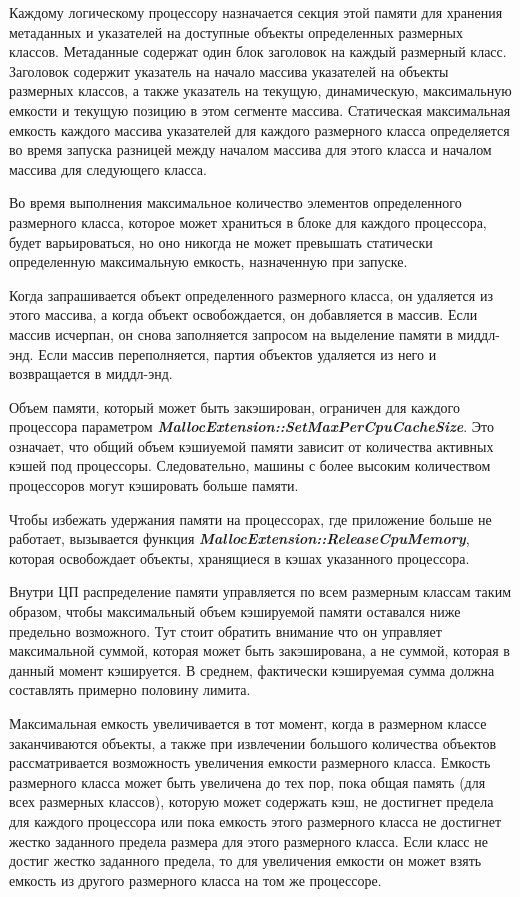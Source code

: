 Каждому логическому процессору назначается секция этой памяти для хранения метаданных и указателей на доступные объекты определенных размерных классов. Метаданные содержат один блок заголовок на каждый размерный класс. Заголовок содержит указатель на начало массива указателей на объекты размерных классов, а также указатель на текущую, динамическую, максимальную емкости и текущую позицию в этом сегменте массива. Статическая максимальная емкость каждого массива указателей для каждого размерного класса определяется во время запуска разницей между началом массива для этого класса и началом массива для следующего класса.

Во время выполнения максимальное количество элементов определенного размерного класса, которое может храниться в блоке для каждого процессора, будет варьироваться, но оно никогда не может превышать статически определенную максимальную емкость, назначенную при запуске.

Когда запрашивается объект определенного размерного класса, он удаляется из этого массива, а когда объект освобождается, он добавляется в массив. Если массив исчерпан, он снова заполняется запросом на выделение памяти в миддл-энд. Если массив переполняется, партия объектов удаляется из него и возвращается в миддл-энд.

Объем памяти, который может быть закэширован, ограничен для каждого процессора параметром \textbf{\textit{MallocExtension::SetMaxPerCpuCacheSize}}. Это означает, что общий объем кэшиуемой памяти зависит от количества активных кэшей под процессоры. Следовательно, машины с более высоким количеством процессоров могут кэшировать больше памяти.

Чтобы избежать удержания памяти на процессорах, где приложение больше не работает, вызывается функция \textbf{\textit{MallocExtension::ReleaseCpuMemory}}, которая освобождает объекты, хранящиеся в кэшах указанного процессора.

Внутри ЦП распределение памяти управляется по всем размерным классам таким образом, чтобы максимальный объем кэшируемой памяти оставался ниже предельно возможного. Тут стоит обратить внимание что он управляет максимальной суммой, которая может быть закэширована, а не суммой, которая в данный момент кэшируется. В среднем, фактически кэшируемая сумма должна составлять примерно половину лимита.

Максимальная емкость увеличивается в тот момент, когда в размерном классе заканчиваются объекты, а также при извлечении большого количества объектов рассматривается возможность увеличения емкости размерного класса. Емкость размерного класса может быть увеличена до тех пор, пока общая память (для всех размерных классов), которую может содержать кэш, не достигнет предела для каждого процессора или пока емкость этого размерного класса не достигнет жестко заданного предела размера для этого размерного класса. Если класс не достиг жестко заданного предела, то для увеличения емкости он может взять емкость из другого размерного класса на том же процессоре.


